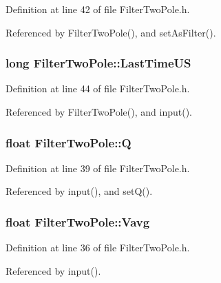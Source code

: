 Definition at line 42 of file Filter\+Two\+Pole.\+h.



Referenced by Filter\+Two\+Pole(), and set\+As\+Filter().

\subsubsection[{\texorpdfstring{Last\+Time\+US}{LastTimeUS}}]{\setlength{\rightskip}{0pt plus 5cm}long Filter\+Two\+Pole\+::\+Last\+Time\+US}\hypertarget{struct_filter_two_pole_a0cb5f7e1f22358a3b80ba1955958082e}{}\label{struct_filter_two_pole_a0cb5f7e1f22358a3b80ba1955958082e}


Definition at line 44 of file Filter\+Two\+Pole.\+h.



Referenced by Filter\+Two\+Pole(), and input().

\subsubsection[{\texorpdfstring{Q}{Q}}]{\setlength{\rightskip}{0pt plus 5cm}float Filter\+Two\+Pole\+::Q}\hypertarget{struct_filter_two_pole_af42fb47a6163a710768a4ab4c6551a08}{}\label{struct_filter_two_pole_af42fb47a6163a710768a4ab4c6551a08}


Definition at line 39 of file Filter\+Two\+Pole.\+h.



Referenced by input(), and set\+Q().

\subsubsection[{\texorpdfstring{Vavg}{Vavg}}]{\setlength{\rightskip}{0pt plus 5cm}float Filter\+Two\+Pole\+::\+Vavg}\hypertarget{struct_filter_two_pole_a1cf9be9b3615421ad0d4a985f29b223d}{}\label{struct_filter_two_pole_a1cf9be9b3615421ad0d4a985f29b223d}


Definition at line 36 of file Filter\+Two\+Pole.\+h.



Referenced by input().

